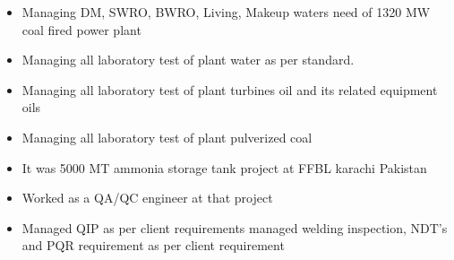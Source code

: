 \documentclass[10pt,a4paper,ragged2e]{article}
\begin{document}
	
	\begin{fullwidth}\makecvheader
	\end{fullwidth}
	
	
	
	\begin{itemize}
		\item Managing DM, SWRO, BWRO, Living, Makeup waters need of 1320 MW coal fired power plant
		\item Managing all laboratory test of plant water as per standard.
		\item Managing all laboratory test of plant turbines oil and its related equipment oils
		\item Managing all laboratory test of plant pulverized coal
	\end{itemize}
	
	\divider
	
	\begin{itemize}
		\item It was 5000 MT ammonia storage tank project at FFBL karachi Pakistan  
		\item Worked as a QA/QC engineer at that project
		\item Managed QIP as per client requirements managed welding inspection, NDT's and PQR requirement as per client requirement 
	\end{itemize}
	
\end{document}
